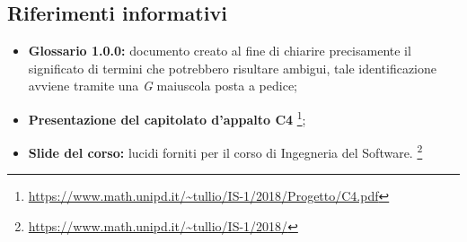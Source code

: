 \subsection{Riferimenti informativi}
\begin{itemize}
	
	\item \textbf{Glossario 1.0.0:} documento creato al fine di chiarire precisamente il significato di termini che potrebbero risultare ambigui, tale identificazione avviene tramite una \textit{G} maiuscola posta a pedice; 
	\item \textbf{Presentazione del capitolato d'appalto C4} \footnote{\url{https://www.math.unipd.it/~tullio/IS-1/2018/Progetto/C4.pdf}};
	\item \textbf{Slide del corso:} lucidi forniti per il corso di Ingegneria del Software. \footnote{\url{https://www.math.unipd.it/~tullio/IS-1/2018/}}
\end{itemize}
